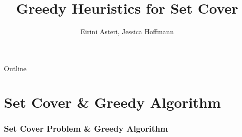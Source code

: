 \documentclass[xcolor=dvipsnames]{beamer}
\title[Your Short Title]{Greedy Heuristics for Set Cover}
\author{Eirini Asteri, Jessica Hoffmann}
\institute{University of Texas, Austin}
\date{}
\begin{document}
\begin{frame}
  \titlepage
\end{frame}

\begin{frame}{Outline}
  \tableofcontents
\end{frame}

\section{Set Cover \& Greedy Algorithm}
\begin{frame}
\frametitle{Set Cover Problem \& Greedy Algorithm}
\begin{minipage}{0.45\textwidth}
\begin{overlayarea}{\textwidth}{0.5\textheight}
% 
% 

\end{overlayarea}
\end{minipage}
\end{frame}
\end{document}
